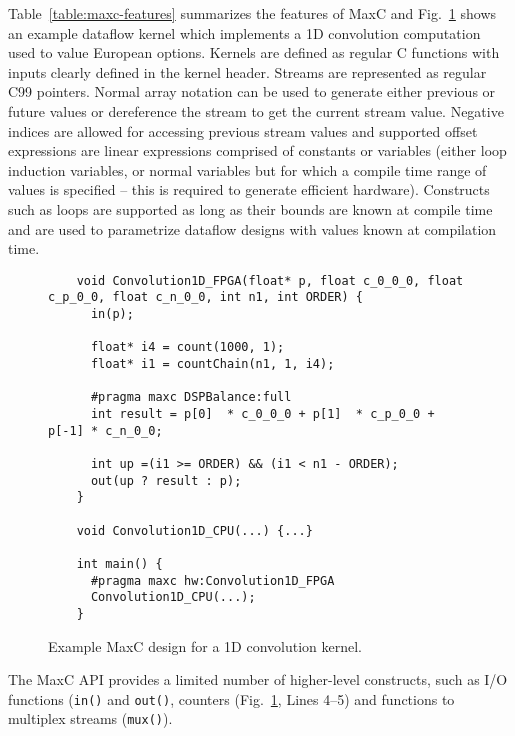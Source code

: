 Table~\ref{table:maxc-features} summarizes the features of MaxC and
Fig.~\ref{fig:maxc-1dconv} shows an example dataflow kernel which
implements a 1D convolution computation used to value European
options.  Kernels are defined as regular C functions with inputs
clearly defined in the kernel header. Streams are represented as
regular C99 pointers.  Normal array notation can be used to generate
either previous or future values or dereference the stream to get the
current stream value. Negative indices are allowed for accessing
previous stream values and supported offset expressions are linear
expressions comprised of constants or variables (either loop induction
variables, or normal variables but for which a compile time range of
values is specified -- this is required to generate efficient
hardware). Constructs such as loops are supported as long as their
bounds are known at compile time and are used to parametrize dataflow
designs with values known at compilation time.

\lstset{style=MaxC}

\begin{figure}[!h]
  \begin{lstlisting}
    void Convolution1D_FPGA(float* p, float c_0_0_0, float c_p_0_0, float c_n_0_0, int n1, int ORDER) {
      in(p);

      float* i4 = count(1000, 1);
      float* i1 = countChain(n1, 1, i4);

      #pragma maxc DSPBalance:full
      int result = p[0]  * c_0_0_0 + p[1]  * c_p_0_0 + p[-1] * c_n_0_0;

      int up =(i1 >= ORDER) && (i1 < n1 - ORDER);
      out(up ? result : p);
    }

    void Convolution1D_CPU(...) {...}

    int main() {
      #pragma maxc hw:Convolution1D_FPGA
      Convolution1D_CPU(...);
    }
  \end{lstlisting}
  \caption{Example MaxC design for a 1D convolution kernel.}
  \label{fig:maxc-1dconv}
\end{figure}


The MaxC API provides a limited number of higher-level constructs, such as I/O
functions (\texttt{in()} and \texttt{out()}, counters (Fig.~\ref{fig:maxc-1dconv},
Lines 4--5) and functions to multiplex streams (\texttt{mux()}).

